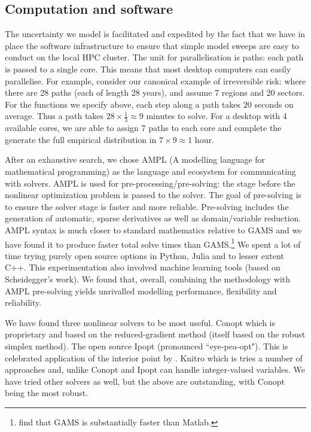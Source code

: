 \documentclass[12pt,a4paper,twoside, draft]{article}
\begin{document}
\subsection{Computation and software}

The uncertainty we model is facilitated and expedited by the fact that we have
in place the software infrastructure to ensure that simple model sweeps are
easy to conduct on the local HPC cluster.
The unit for parallelisation is paths: each path is passed to a single core.
This means that most desktop computers can easily parallelise.
For example, consider our canonical example of irreversible risk: where there
are 28 paths (each of length 28 years), and assume 7 regions and 20 sectors.
For the functions we specify above, each step along a path takes $20$ seconds
on average.
Thus a path takes $28\times \frac{1}{3} \approx 9$ minutes to solve.
For a desktop with 4 available cores, we are able to assign 7 paths to each
core and complete the generate the full empirical distribution in
$7\times 9 \approx 1$ hour.

After an exhaustive search, we chose AMPL (A modelling language for
mathematical programming) \citet{Fourer_Gay_Kernighan-AMPL} as the language and 
ecosystem for communicating with solvers.
AMPL is used for pre-processing/pre-solving: the stage before the nonlinear
optimization problem is passed to the solver.
The goal of pre-solving is to ensure the solver stage is faster and more
reliable.
Pre-solving includes the generation of automatic, sparse derivatives as well as
domain/variable reduction.
AMPL syntax is much closer to standard mathematics relative to GAMS and we have
found it to produce faster total solve times than GAMS.\footnote{
\citet{CJ} find that GAMS is substantially faster than Matlab.
}
We spent a lot of time trying purely open source options in Python, Julia and
to lesser extent C++.
This experimentation also involved machine learning tools (based on
Scheidegger's work).
We found that, overall, combining the \citet{CJ} methodology with AMPL
pre-solving yields unrivalled modelling performance, flexibility and
reliability.


We have found three nonlinear solvers to be most useful.
Conopt which is proprietary and based on the reduced-gradient method (itself
based on the robust simplex method).
The open source Ipopt (pronounced ``eye-pea-opt"). This is celebrated
application of the interior point by \citet{Wachter_Biegler-Ipopt}.
Knitro which is tries a number of approaches and, unlike Conopt and Ipopt can
handle integer-valued variables. 
We have tried other solvers as well, but the above are outstanding, with Conopt
being the most robust.
\end{document}
